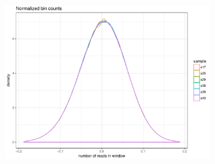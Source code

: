 \begin{figure}[htp]
\begin{subfigure}[b]{.3\textwidth}
    \includegraphics[width=\linewidth,page=5]{figures/twin-biasWGS-QDNAseq.pdf}
    \caption{}
  \end{subfigure}


\end{figure}
